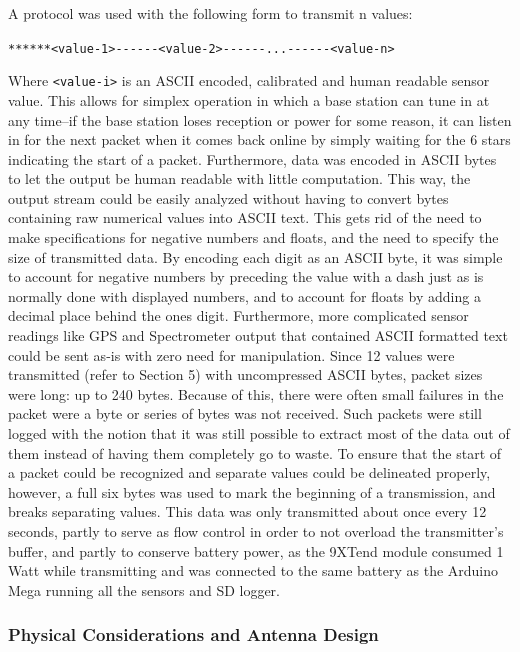\documentclass[12pt,]{article}
\begin{document}
A protocol was used with the following form to transmit n values:

\texttt{******\textless{}value-1\textgreater{}-\/-\/-\/-\/-\/-\textless{}value-2\textgreater{}-\/-\/-\/-\/-\/-...-\/-\/-\/-\/-\/-\textless{}value-n\textgreater{}}

Where \texttt{\textless{}value-i\textgreater{}} is an ASCII encoded,
calibrated and human readable sensor value. This allows for simplex
operation in which a base station can tune in at any time--if the base
station loses reception or power for some reason, it can listen in for
the next packet when it comes back online by simply waiting for the 6
stars indicating the start of a packet. Furthermore, data was encoded in
ASCII bytes to let the output be human readable with little computation.
This way, the output stream could be easily analyzed without having to
convert bytes containing raw numerical values into ASCII text. This gets
rid of the need to make specifications for negative numbers and floats,
and the need to specify the size of transmitted data. By encoding each
digit as an ASCII byte, it was simple to account for negative numbers by
preceding the value with a dash just as is normally done with displayed
numbers, and to account for floats by adding a decimal place behind the
ones digit. Furthermore, more complicated sensor readings like GPS and
Spectrometer output that contained ASCII formatted text could be sent
as-is with zero need for manipulation. Since 12 values were transmitted
(refer to Section 5) with uncompressed ASCII bytes, packet sizes were
long: up to 240 bytes. Because of this, there were often small failures
in the packet were a byte or series of bytes was not received. Such
packets were still logged with the notion that it was still possible to
extract most of the data out of them instead of having them completely
go to waste. To ensure that the start of a packet could be recognized
and separate values could be delineated properly, however, a full six
bytes was used to mark the beginning of a transmission, and breaks
separating values. This data was only transmitted about once every 12
seconds, partly to serve as flow control in order to not overload the
transmitter's buffer, and partly to conserve battery power, as the
9XTend module consumed 1 Watt while transmitting and was connected to
the same battery as the Arduino Mega running all the sensors and SD
logger.

\subsubsection{Physical Considerations and Antenna
Design}\label{physical-considerations-and-antenna-design}
\end{document}
